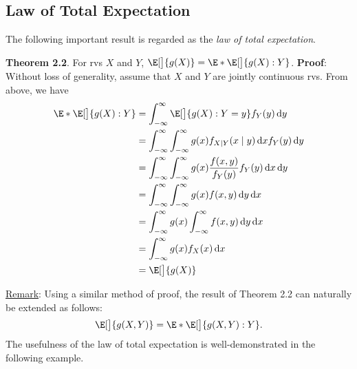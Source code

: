 \subsection*{Law of Total Expectation}
The following important result is regarded as the \emph{law of total expectation}.
\begin{Result}{}
    \textbf{Theorem 2.2}. For rvs $ X $ and $ Y $, $ \E[\big]{g(X)}=\E*{\E[\big]{g(X)\given Y}} $.
    \tcblower{}
    \textbf{Proof}: Without loss of generality, assume that $ X $ and $ Y $ are jointly continuous
    rvs. From above, we have
    \begin{align*}
        \E*{\E[\big]{g(X)\given Y}}
         & =\int_{-\infty}^{\infty}\E[\big]{g(X)\given Y=y}f_Y(y)\odif{y}                                 \\
         & =\int_{-\infty}^{\infty}\int_{-\infty}^{\infty}g(x)f_{X\mid Y}(x\mid y)\odif{x} f_Y(y)\odif{y} \\
         & =\int_{-\infty}^{\infty}\int_{-\infty}^{\infty}g(x)\frac{f(x,y)}{f_Y(y)} f_Y(y)\odif{x,y}      \\
         & =\int_{-\infty}^{\infty}\int_{-\infty}^{\infty}g(x)f(x,y)\odif{y,x}                            \\
         & =\int_{-\infty}^{\infty}g(x)\int_{-\infty}^{\infty}f(x,y)\odif{y} \odif{x}                     \\
         & =\int_{-\infty}^{\infty}g(x)f_X(x)\odif{x}                                                     \\
         & =\E[\big]{g(X)}
    \end{align*}
\end{Result}
\underline{Remark}: Using a similar method of proof, the result of Theorem 2.2 can naturally be extended
as follows:
\[ \E[\big]{g(X,Y)}=\E*{\E[\big]{g(X,Y)\given Y}}. \]
The usefulness of the law of total expectation is well-demonstrated in the following example.
